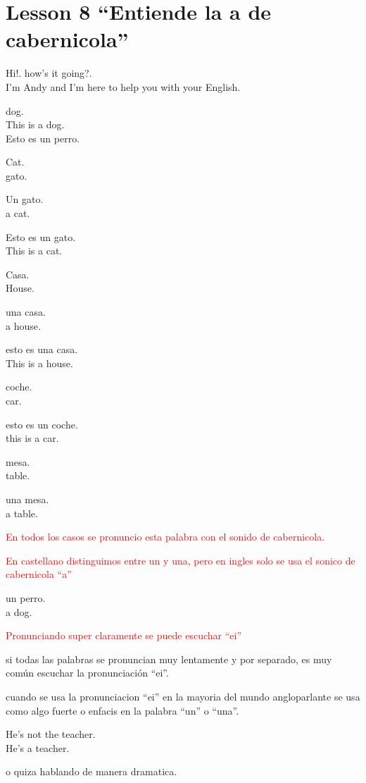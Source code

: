 \section{Lesson 8 ``Entiende la a de cabernicola''}

Hi!. how's it going?.\\
I'm Andy and I'm here to help you with your English.

dog.\\
This is a dog.\\
Esto es un perro.

Cat.\\
gato.

Un gato.\\
a cat.

Esto es un gato.\\
This is a cat.

Casa.\\
House.

una casa.\\
a house.

esto es una casa.\\
This is a house.

coche.\\
car.

esto es un coche.\\
this is a car.

mesa.\\
table.

una mesa.\\
a table.

\textcolor{red}{En todos los casos se pronuncio esta palabra con el
sonido de cabernicola.}

\textcolor{red}{En castellano distinguimos entre un y una, pero en ingles
solo se usa el sonico de cabernicola ``a''}

un perro.\\
a dog.

\textcolor{red}{Pronunciando super claramente se puede escuchar ``ei''}

si todas las palabras se pronuncian muy lentamente y por separado, es muy
común escuchar la pronunciación ``ei''.

cuando se usa la pronunciacion ``ei'' en la mayoria del mundo angloparlante
se usa como algo fuerte o enfacis en la palabra ``un'' o ``una''.

He's not the teacher.\\
He's a teacher.

o quiza hablando de manera dramatica.

